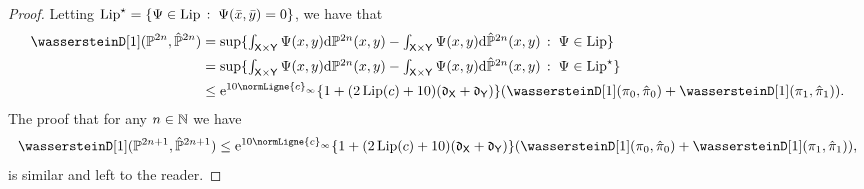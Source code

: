 \documentclass[11pt,a4paper]{article}
\begin{document}
\begin{proof}
Letting
$\mathrm{Lip}^\star = \{\Psi \in \mathrm{Lip}\,:\; \Psi(\bar{x}, \bar{y}) =0\}$,
we have that
\begin{align}
  \wassersteinD[1](\Pbb^{2n}, \hat{\Pbb}^{2n}) &= \sup \ensembleLigne{\textstyle{\int_{\msx \times \msy} \Psi(x,y) \rmd \Pbb^{2n}(x,y) - \int_{\msx \times \msy} \Psi(x,y) \rmd \hat{\Pbb}^{2n}(x,y)}}{\Psi \in \Lipset} \\
                                               &= \sup \ensembleLigne{\textstyle{\int_{\msx \times \msy} \Psi(x,y) \rmd \Pbb^{2n}(x,y) - \int_{\msx \times \msy} \Psi(x,y) \rmd \hat{\Pbb}^{2n}(x,y)}}{\Psi \in \Lipset^\star} \\
  &\leq \rme^{10 \normLigne{c}_\infty} \{1 + (2\Lip(c)+10) (\diam_\msx + \diam_\msy) \}  (\wassersteinD[1](\pi_0, \hat{\pi}_0) + \wassersteinD[1](\pi_1, \hat{\pi}_1)).
\end{align}
The proof that for any $n \in \mathbb{N}$ we have
\begin{equation}
  \wassersteinD[1](\Pbb^{2n+1}, \hat{\Pbb}^{2n+1}) \leq  \rme^{10 \normLigne{c}_\infty} \{1 + (2\Lip(c)+10) (\diam_\msx + \diam_\msy) \}  (\wassersteinD[1](\pi_0, \hat{\pi}_0) + \wassersteinD[1](\pi_1, \hat{\pi}_1)),
\end{equation}
is similar and left to the reader.
\end{proof}
\end{document}

